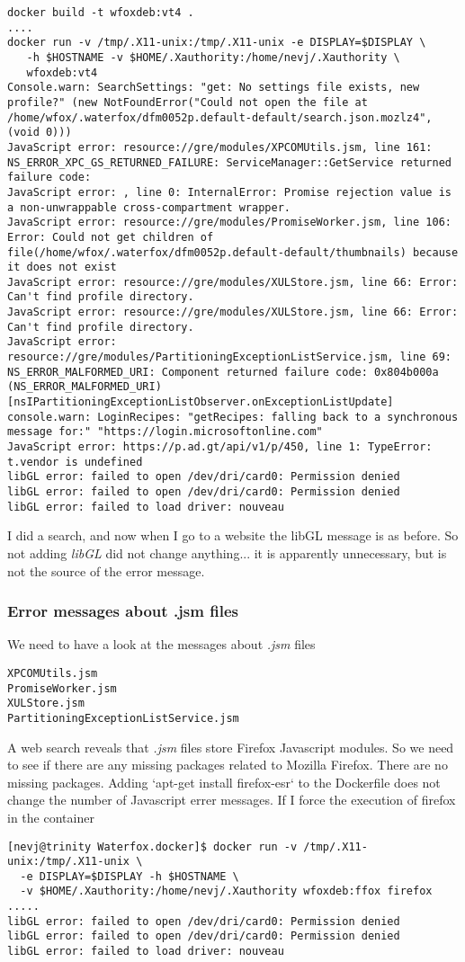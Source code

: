 \documentclass{article}  %
\begin{document}
\begin{verbatim}
docker build -t wfoxdeb:vt4 .
....
docker run -v /tmp/.X11-unix:/tmp/.X11-unix -e DISPLAY=$DISPLAY \
   -h $HOSTNAME -v $HOME/.Xauthority:/home/nevj/.Xauthority \
   wfoxdeb:vt4
Console.warn: SearchSettings: "get: No settings file exists, new profile?" (new NotFoundError("Could not open the file at /home/wfox/.waterfox/dfm0052p.default-default/search.json.mozlz4", (void 0)))
JavaScript error: resource://gre/modules/XPCOMUtils.jsm, line 161: NS_ERROR_XPC_GS_RETURNED_FAILURE: ServiceManager::GetService returned failure code:
JavaScript error: , line 0: InternalError: Promise rejection value is a non-unwrappable cross-compartment wrapper.
JavaScript error: resource://gre/modules/PromiseWorker.jsm, line 106: Error: Could not get children of file(/home/wfox/.waterfox/dfm0052p.default-default/thumbnails) because it does not exist
JavaScript error: resource://gre/modules/XULStore.jsm, line 66: Error: Can't find profile directory.
JavaScript error: resource://gre/modules/XULStore.jsm, line 66: Error: Can't find profile directory.
JavaScript error: resource://gre/modules/PartitioningExceptionListService.jsm, line 69: NS_ERROR_MALFORMED_URI: Component returned failure code: 0x804b000a (NS_ERROR_MALFORMED_URI) [nsIPartitioningExceptionListObserver.onExceptionListUpdate]
console.warn: LoginRecipes: "getRecipes: falling back to a synchronous message for:" "https://login.microsoftonline.com"
JavaScript error: https://p.ad.gt/api/v1/p/450, line 1: TypeError: t.vendor is undefined
libGL error: failed to open /dev/dri/card0: Permission denied
libGL error: failed to open /dev/dri/card0: Permission denied
libGL error: failed to load driver: nouveau
\end{verbatim}
I did a search, and now when I go to a website the libGL message is as before. So not adding {\em libGL} did not change anything... it is apparently unnecessary, but is not the source of the error message.  

\subsubsection{Error messages about .jsm files}
We need to have a look at the messages about {\em .jsm} files
\begin{verbatim}
XPCOMUtils.jsm
PromiseWorker.jsm
XULStore.jsm
PartitioningExceptionListService.jsm
\end{verbatim}
A web search reveals that {\em .jsm} files store Firefox Javascript modules. So we need to see if there are any missing packages related to Mozilla Firefox.
There are no missing packages. 
Adding `apt-get install firefox-esr` to the Dockerfile does not change the number of Javascript errer messages.  If I force the execution of firefox in the container
\begin{verbatim}
[nevj@trinity Waterfox.docker]$ docker run -v /tmp/.X11-unix:/tmp/.X11-unix \
  -e DISPLAY=$DISPLAY -h $HOSTNAME \
  -v $HOME/.Xauthority:/home/nevj/.Xauthority wfoxdeb:ffox firefox
.....
libGL error: failed to open /dev/dri/card0: Permission denied
libGL error: failed to open /dev/dri/card0: Permission denied
libGL error: failed to load driver: nouveau
\end{verbatim}
\end{document}
